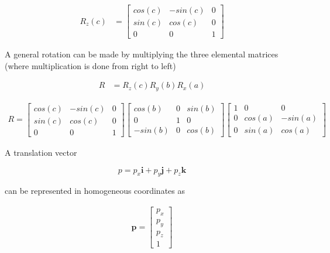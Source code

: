 \documentclass[a4paper, titlepage]{article}
\begin{document}
\begin{equation}
\begin{split}
R_{z}(c)
&=
\begin{bmatrix}
cos(c) & -sin(c) & 0 \\ sin(c) & cos(c) & 0 \\ 0 & 0 & 1
\end{bmatrix}
\end{split}
\end{equation}

A general rotation can be made by multiplying the three elemental matrices (where multiplication is done from right to left)\citep[p.23]{ho90}

\begin{equation}
\begin{split}
R
&= R_{z}(c)R_{y}(b)R_{x}(a)
\end{split}
\end{equation}

\begin{equation}
\begin{split}
R = 
\begin{bmatrix}
cos(c) & -sin(c) & 0 \\ sin(c) & cos(c) & 0 \\ 0 & 0 & 1
\end{bmatrix}
\begin{bmatrix}
cos(b) & 0 & sin(b) \\ 0 & 1 & 0 \\ -sin(b) & 0 & cos(b)
\end{bmatrix}
\begin{bmatrix}
1 & 0 & 0 \\ 0 & cos(a) & -sin(a) \\ 0 & sin(a) & cos(a)
\end{bmatrix}
\end{split}
\end{equation}


A translation vector

\begin{equation}
p = p_{x}\boldsymbol{i} + p_{y}\boldsymbol{j} + p_{z}\boldsymbol{k} 
\end{equation}

can be represented in homogeneous coordinates as\citep[p.12]{ho90}

\begin{equation}
\begin{split}
\boldsymbol{p} = 
\begin{bmatrix}
p_{x} \\ p_{y} \\ p_{z} \\ 1
\end{bmatrix}
\end{split}
\end{equation}
\end{document}
